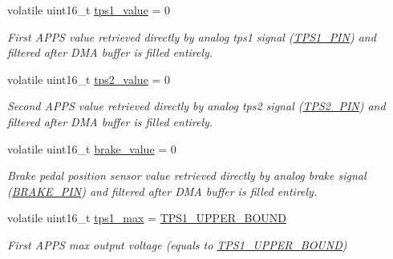 \begin{DoxyCompactItemize}
volatile uint16\+\_\+t \mbox{\hyperlink{group___board__model__group_ga3d6043851868b7da3c1d6381f835a559}{tps1\+\_\+value}} = 0
\begin{DoxyCompactList}\small\item\em First A\+P\+PS value retrieved directly by analog tps1 signal (\mbox{\hyperlink{group___board__pinout__group_gae9aa914854f611488701c96a330b0bd4}{T\+P\+S1\+\_\+\+P\+IN}}) and filtered after D\+MA buffer is filled entirely. \end{DoxyCompactList}\item 
\mbox{\label{group___board__model__group_gaa8a9b03858f40eadfd5d3d6c3e266834}} 
volatile uint16\+\_\+t \mbox{\hyperlink{group___board__model__group_gaa8a9b03858f40eadfd5d3d6c3e266834}{tps2\+\_\+value}} = 0
\begin{DoxyCompactList}\small\item\em Second A\+P\+PS value retrieved directly by analog tps2 signal (\mbox{\hyperlink{group___board__pinout__group_gab13a816bae3ca994897fc6f1cb590a67}{T\+P\+S2\+\_\+\+P\+IN}}) and filtered after D\+MA buffer is filled entirely. \end{DoxyCompactList}\item 
\mbox{\label{group___board__model__group_gad7966e70fb4bebc6947eb3fbb059a3c9}} 
volatile uint16\+\_\+t \mbox{\hyperlink{group___board__model__group_gad7966e70fb4bebc6947eb3fbb059a3c9}{brake\+\_\+value}} = 0
\begin{DoxyCompactList}\small\item\em Brake pedal position sensor value retrieved directly by analog brake signal (\mbox{\hyperlink{group___board__pinout__group_gad632b56bf4c6259a390c3db91607078e}{B\+R\+A\+K\+E\+\_\+\+P\+IN}}) and filtered after D\+MA buffer is filled entirely. \end{DoxyCompactList}\item 
\mbox{\label{group___board__model__group_gaf1d46fb483b2a63c3da25c11688af7c4}} 
volatile uint16\+\_\+t \mbox{\hyperlink{group___board__model__group_gaf1d46fb483b2a63c3da25c11688af7c4}{tps1\+\_\+max}} = \mbox{\hyperlink{group___board__model__group_ga6741cba3daf129b6f73eed1b1db09519}{T\+P\+S1\+\_\+\+U\+P\+P\+E\+R\+\_\+\+B\+O\+U\+ND}}
\begin{DoxyCompactList}\small\item\em First A\+P\+PS max output voltage (equals to \mbox{\hyperlink{group___board__model__group_ga6741cba3daf129b6f73eed1b1db09519}{T\+P\+S1\+\_\+\+U\+P\+P\+E\+R\+\_\+\+B\+O\+U\+ND}}) \end{DoxyCompactList}\item 

\end{DoxyCompactItemize}
